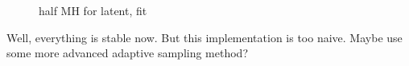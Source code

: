 \documentclass[]{article}
\begin{document}
\begin{figure}[h!]
	\caption{half MH for latent, fit}
	\label{half MH: fit}
\end{figure}

Well, everything is stable now. But this implementation is too naive. Maybe use some more advanced adaptive sampling method?
\end{document}
